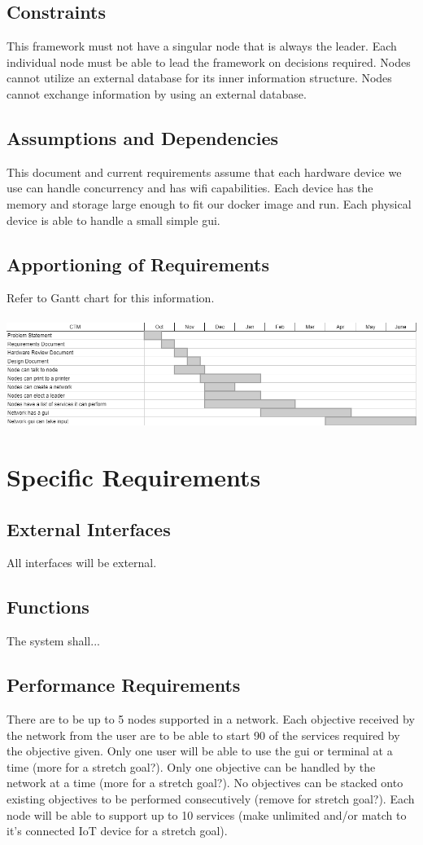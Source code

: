 \documentclass[draftclsnofoot, onecolumn, compsoc, 10pt]{IEEEtran}
\begin{document}
\subsection{Constraints}
This framework must not have a singular node that is always the leader. Each individual node must be able to lead the framework on decisions required. Nodes cannot utilize an external database for its inner information structure. Nodes cannot exchange information by using an external database.

\subsection{Assumptions and Dependencies}
This document and current requirements assume that each hardware device we use can handle concurrency and has wifi capabilities. Each device has the memory and storage large enough to fit our docker image and run. Each physical device is able to handle a small simple gui.

\subsection{Apportioning of Requirements}
Refer to Gantt chart for this information.\\\\ 
{\centering\includegraphics[scale=0.4]{chart}}


\section{Specific Requirements}
\subsection{External Interfaces}
All interfaces will be external.

\subsection{Functions}
The system shall...

\subsection{Performance Requirements}
There are to be up to 5 nodes supported in a network. Each objective received by the network from the user are to be able to start 90 of the services required by the objective given. Only one user will be able to use the gui or terminal at a time (more for a stretch goal?). Only one objective can be handled by the network at a time (more for a stretch goal?). No objectives can be stacked onto existing objectives to be performed consecutively (remove for stretch goal?). Each node will be able to support up to 10 services (make unlimited and/or match to it’s connected IoT device for a stretch goal).
\end{document}
